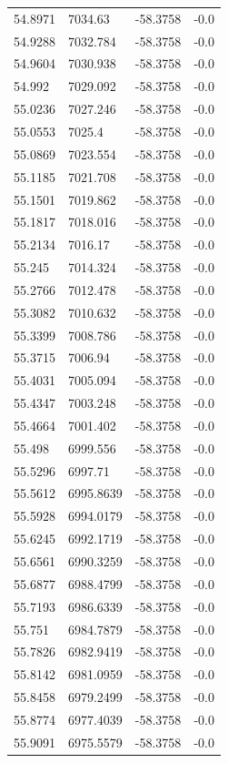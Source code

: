 \begin{table}[H]
\begin{tabular}{llll}
54.8971 & 7034.63 & -58.3758 & -0.0 \\
54.9288 & 7032.784 & -58.3758 & -0.0 \\
54.9604 & 7030.938 & -58.3758 & -0.0 \\
54.992 & 7029.092 & -58.3758 & -0.0 \\
55.0236 & 7027.246 & -58.3758 & -0.0 \\
55.0553 & 7025.4 & -58.3758 & -0.0 \\
55.0869 & 7023.554 & -58.3758 & -0.0 \\
55.1185 & 7021.708 & -58.3758 & -0.0 \\
55.1501 & 7019.862 & -58.3758 & -0.0 \\
55.1817 & 7018.016 & -58.3758 & -0.0 \\
55.2134 & 7016.17 & -58.3758 & -0.0 \\
55.245 & 7014.324 & -58.3758 & -0.0 \\
55.2766 & 7012.478 & -58.3758 & -0.0 \\
55.3082 & 7010.632 & -58.3758 & -0.0 \\
55.3399 & 7008.786 & -58.3758 & -0.0 \\
55.3715 & 7006.94 & -58.3758 & -0.0 \\
55.4031 & 7005.094 & -58.3758 & -0.0 \\
55.4347 & 7003.248 & -58.3758 & -0.0 \\
55.4664 & 7001.402 & -58.3758 & -0.0 \\
55.498 & 6999.556 & -58.3758 & -0.0 \\
55.5296 & 6997.71 & -58.3758 & -0.0 \\
55.5612 & 6995.8639 & -58.3758 & -0.0 \\
55.5928 & 6994.0179 & -58.3758 & -0.0 \\
55.6245 & 6992.1719 & -58.3758 & -0.0 \\
55.6561 & 6990.3259 & -58.3758 & -0.0 \\
55.6877 & 6988.4799 & -58.3758 & -0.0 \\
55.7193 & 6986.6339 & -58.3758 & -0.0 \\
55.751 & 6984.7879 & -58.3758 & -0.0 \\
55.7826 & 6982.9419 & -58.3758 & -0.0 \\
55.8142 & 6981.0959 & -58.3758 & -0.0 \\
55.8458 & 6979.2499 & -58.3758 & -0.0 \\
55.8774 & 6977.4039 & -58.3758 & -0.0 \\
55.9091 & 6975.5579 & -58.3758 & -0.0 \\

\end{tabular}
\end{table}
